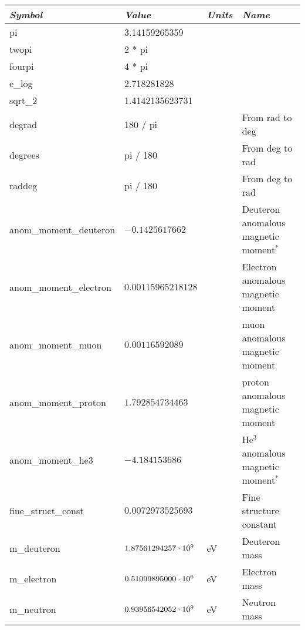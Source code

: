 {{{\begin{table}[h]
\centering
\begin{tabular}{llll} \toprule
  {\em Symbol}          & {\em Value}                & {\em Units} &  {\em Name}           \\ \midrule
  pi                    & 3.14159265359              &             &                       \\
  twopi                 & 2 * pi                     &             &                       \\
  fourpi                & 4 * pi                     &             &                       \\
  e_log                 & 2.718281828                &             &                       \\
  sqrt_2                & 1.4142135623731            &             &                       \\
  degrad                & 180 / pi                   &             & From rad to deg       \\
  degrees               & pi / 180                   &             & From deg to rad       \\
  raddeg                & pi / 180                   &             & From deg to rad       \\
  anom_moment_deuteron  & $-0.1425617662$            &             & Deuteron anomalous magnetic moment$^*$ \\
  anom_moment_electron  & $0.00115965218128$         &             & Electron anomalous magnetic moment     \\
  anom_moment_muon      & $0.00116592089$            &             & muon anomalous magnetic moment         \\
  anom_moment_proton    & $1.792854734463$           &             & proton anomalous magnetic moment       \\
  anom_moment_he3       & $-4.184153686$             &             & He$^3$ anomalous magnetic moment$^*$   \\ 
  fine_struct_const     & $0.0072973525693$          &             & Fine structure constant                \\
  m_deuteron            & $1.87561294257 \cdot 10^{9}$    & eV          & Deuteron mass         \\
  m_electron            & $0.51099895000 \cdot 10^{6}$    & eV          & Electron mass         \\
  m_neutron             & $0.93956542052 \cdot 10^{9}$    & eV          & Neutron mass          \\

\end{tabular}
\end{table}}}}
